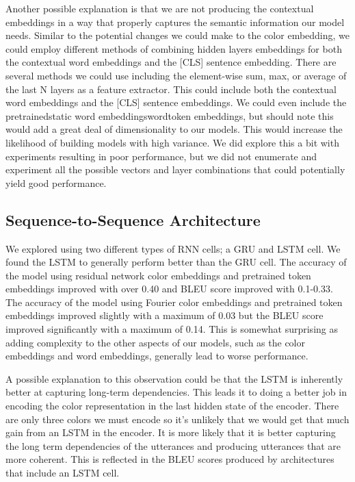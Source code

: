 \par
Another possible explanation is that we are not producing the contextual embeddings in a way that properly captures the semantic information our model needs. Similar to the potential changes we could make to the color embedding, we could employ different methods of combining hidden layers embeddings for both the contextual word embeddings and the [CLS] sentence embedding. There are several methods we could use including the element-wise sum, max, or average of the last N layers as a feature extractor. This could include both the contextual word embeddings and the [CLS] sentence embeddings. We could even include the pretrainedstatic word embeddingswordtoken embeddings, but should note this would add a great deal of dimensionality to our models. This would increase the likelihood of building models with high variance.  We did explore this a bit with experiments resulting in poor performance, but we did not enumerate and experiment all the possible vectors and layer combinations that could potentially yield good performance.


\subsection{Sequence-to-Sequence Architecture}

We explored using two different types of RNN cells; a GRU and LSTM cell.  We found the LSTM to generally perform better than the GRU cell. The accuracy of the model using residual network color embeddings and pretrained token embeddings improved with over 0.40 and BLEU score improved with 0.1-0.33. The accuracy of the model using Fourier color embeddings and pretrained token embeddings improved slightly with a maximum of 0.03 but the BLEU score improved significantly with a maximum of 0.14. This is somewhat surprising as adding complexity to the other aspects of our models, such as the color embeddings and word embeddings, generally lead to worse performance.

\par
A possible explanation to this observation could be that the LSTM is inherently better at capturing long-term dependencies. This leads it to doing a better job in encoding the color representation in the last hidden state of the encoder. There are only three colors we must encode so it’s unlikely that we would get that much gain from an LSTM in the encoder. It is more likely that it is better capturing the long term dependencies of the utterances and producing utterances that are more coherent. This is reflected in the BLEU scores produced by architectures that include an LSTM cell.

